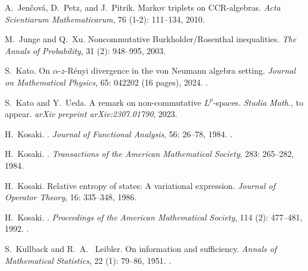 \documentclass[12pt]{article}
\theoremstyle{definition}
\theoremstyle{remark}
\numberwithin{equation}{section}
\begin{document}
\begin{thebibliography}{27}
A.~Jen{\v c}ov{\'a}, D.~Petz, and J.~Pitrik.
\newblock Markov triplets on CCR-algebras.
\newblock \emph{Acta Scientiarum Mathematicarum}, 76 (1-2):
111--134, 2010.

M.~Junge and Q.~Xu.
\newblock Noncommutative {B}urkholder/{R}osenthal inequalities.
\newblock \emph{The Annals of Probability}, 31 (2): 948--995,
  2003.

S.~Kato.
\newblock On $\alpha $-$ z $-{R}\'enyi divergence in the von {N}eumann algebra
  setting.
\newblock \emph{Journal on Mathematical Physics}, 65: 042202 (16 pages),  2024.
\newblock {}.

S.~Kato and Y.~Ueda.
\newblock A remark on non-commutative {$L^p$}-spaces.
\newblock \emph{Studia Math.}, to appear.
\newblock \emph{arXiv preprint arXiv:2307.01790}, 2023.

H.~Kosaki.
.
\newblock \emph{Journal of Functional Analysis}, {56}: 26--78,
  {1984}{}.
\newblock {}.

H.~Kosaki.
.
\newblock \emph{Transactions of the American Mathematical Society}, {283}: 265--282,
  {1984}{}.

H.~Kosaki.
\newblock Relative entropy of states: A variational expression.
\newblock \emph{Journal of Operator Theory}, 16: 335--348, 1986.

H.~Kosaki.
.
\newblock \emph{Proceedings of the American Mathematical Society}, 114
  (2): 477--481, 1992.
\newblock {}.

{\color{red}
S.~Kullback and R.~A.~ Leibler.
\newblock On information and sufficiency.
\newblock \emph{Annals of Mathematical Statistics}, 22 (1):
79--86, 1951.
\newblock {}.
}


\end{thebibliography}
\end{document}
